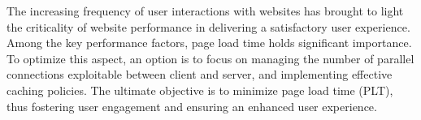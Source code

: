 The increasing frequency of user interactions with websites has brought to light the criticality of website performance 
in delivering a satisfactory user experience. Among the key performance factors, page load time holds significant importance. 
To optimize this aspect, an option is to focus on managing the number of parallel connections exploitable between client and server,
and implementing effective caching policies. The ultimate objective is to minimize page load time (PLT), thus 
fostering user engagement and ensuring an enhanced user experience.